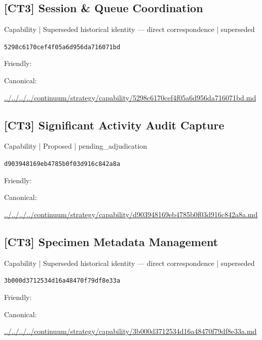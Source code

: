 \documentclass[10pt,a4paper]{article}
\begin{document}
\subsection*{[CT3] Session \& Queue Coordination}
{\small Capability | Superseded historical identity — direct correspondence | superseded}\par
\texttt{5298c6170cef4f05a6d956da716071bd}\par
Friendly: \par
Canonical: \par
{\footnotesize\url{../../../../continuum/strategy/capability/5298c6170cef4f05a6d956da716071bd.md}}\par
\subsection*{[CT3] Significant Activity Audit Capture}
{\small Capability | Proposed | pending\_adjudication}\par
\texttt{d903948169eb4785b0f03d916c842a8a}\par
Friendly: \par
Canonical: \par
{\footnotesize\url{../../../../continuum/strategy/capability/d903948169eb4785b0f03d916c842a8a.md}}\par
\subsection*{[CT3] Specimen Metadata Management}
{\small Capability | Superseded historical identity — direct correspondence | superseded}\par
\texttt{3b000d3712534d16a48470f79df8e33a}\par
Friendly: \par
Canonical: \par
{\footnotesize\url{../../../../continuum/strategy/capability/3b000d3712534d16a48470f79df8e33a.md}}\par
\end{document}
